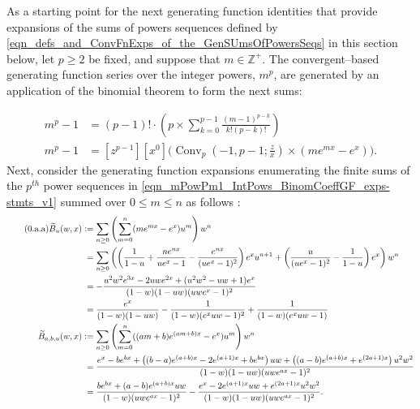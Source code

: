 \documentclass[12pt,reqno]{article}
\renewenvironment{subequations}{%
  \refstepcounter{equation}%
  \edef\theparentequation{\theequation}%
  \setcounter{parentequation}{\value{equation}}%
  \setcounter{equation}{0}%
  \def\theequation{\theparentequation.\alph{equation}}%
  \ignorespaces
}{%
  \setcounter{equation}{\value{parentequation}}%
  \ignorespacesafterend
}
\numberwithin{sfootnote}{section}
\numberwithin{equation}{section}
\newcommand{\tagonce}[0]{
     \addtocounter{equation}{1}
     \tag{\theequation}
}
\theoremstyle{plain}
\theoremstyle{definition}
\theoremstyle{remark}
\newcommand{\cf}[0]{cf.\ }
\newcommand{\defequals}{\ensuremath{\vcentcolon=}}
\newcommand{\StartGroupingSubEquations}{\begin{subequations}}
\newcommand{\EndGroupingSubEquations}{\end{subequations}}
\newcommand{\ConvGF}[4]{\ensuremath{\Conv_{#1}\left(#2, #3; #4\right)}}
\DeclareMathOperator{\Conv}{Conv}
\begin{document}
As a starting point for the next generating function identities 
that provide expansions of the sums of powers 
sequences defined by 
\eqref{eqn_defs_and_ConvFnExps_of_the_GenSUmsOfPowersSeqs} 
in this section below, 
let $p \geq 2$ be fixed, and 
suppose that $m \in \mathbb{Z}^{+}$. 
The convergent--based generating function 
series over the integer powers, $m^{p}$, 
are generated by an application of the binomial theorem to 
form the next sums: 
\StartGroupingSubEquations 
\begin{align} 
\label{eqn_mPowPm1_IntPows_BinomCoeffGF_exps-stmts_v1} 
m^{p} - 1 & = 
     (p-1)! \cdot \left( 
     p \times \sum_{k=0}^{p-1} \frac{(m-1)^{p-k}}{k! (p-k)!} 
     \right) \\ 
\label{eqn_mPowPm1_IntPows_BinomCoeffGF_exps-stmts_v2} 
m^{p} - 1 & = 
     [z^{p-1}] [x^0] \Biggl( 
     \ConvGF{p}{-1}{p-1}{\frac{z}{x}} \times (m e^{mx} - e^{x}) 
     \Biggr). 
\end{align} 
\EndGroupingSubEquations 
Next, consider the generating function expansions 
enumerating the finite sums of the $p^{th}$ power sequences in 
\eqref{eqn_mPowPm1_IntPows_BinomCoeffGF_exps-stmts_v1} summed over 
$0 \leq m \leq n$ as follows \citep[\cf \S 7.6]{GKP}: 
\begin{align*} 
\tagonce\label{eqn_Spn_Conv_and_BNumGF_ident_ex-stmt_v2} 
\widetilde{B}_u(w, x) & \defequals 
     \sum_{n \geq 0} \left( 
     \sum_{m=0}^{n} (me^{mx}-e^{x}) u^{m} 
     \right) w^{n} \\ 
     & \phantom{:} = 
     \sum_{n \geq 0} \left( 
     \left(\frac{1}{1-u} + \frac{n e^{nx}}{u e^{x} - 1} - 
     \frac{e^{nx}}{(u e^{x} - 1)^2}\right) e^{x} u^{n+1} + 
     \left(\frac{u}{(u e^{x} - 1)^2} - \frac{1}{1-u}\right) e^{x} 
     \right) w^{n} \\ 
     & \phantom{:} = 
     -\frac{u^2w^2 e^{3x} - 2 uw e^{2x} + (u^2w^2 -uw + 1) e^{x}}{ 
     (1-w) (1-uw) (uw e^{x} - 1)^2} \\ 
     & \phantom{:} = 
     \frac{e^{x}}{(1-w)(1-uw)} - 
     \frac{1}{(1-w) (e^{x} uw-1)^{2}} + 
     \frac{1}{(1-w) (e^{x} uw - 1)} \\ 
\widetilde{B}_{a,b,u}(w, x) & \defequals 
     \sum_{n \geq 0} \left( 
     \sum_{m=0}^{n} ((am+b) e^{(am+b) x}-e^{x}) u^{m} 
     \right) w^{n} \\ 
     & \phantom{:} = 
     \frac{e^{x} - be^{bx} + 
     \left((b-a)e^{(a+b)x} - 2 e^{(a+1)x} + be^{bx}\right) uw + 
     \left((a-b)e^{(a+b)x} + e^{(2a+1)x} \right) u^{2} w^{2}}{ 
     (1-w) (1-uw) (uw e^{ax} - 1)^2} \\ 
     & \phantom{:} = 
     \frac{be^{bx} + (a-b) e^{(a+b) x} uw}{(1-w) (uw e^{ax}-1)^{2}} - 
     \frac{e^{x} - 2 e^{(a+1) x} uw + e^{(2a+1) x} u^2 w^2}{ 
     (1-w) (1-uw) (uw e^{ax}-1)^{2}}. 
\end{align*} 
\end{document}
